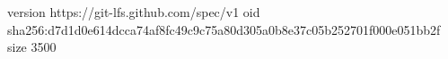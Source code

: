 version https://git-lfs.github.com/spec/v1
oid sha256:d7d1d0e614dcca74af8fc49c9c75a80d305a0b8e37c05b252701f000e051bb2f
size 3500
